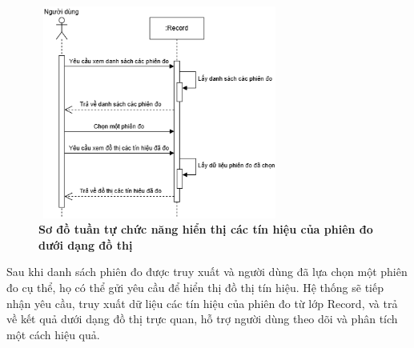 \begin{figure}[H]
	\centering
	\includegraphics[width=8cm,height=7cm]{Images/sequence/record/chart.drawio.png}
	\caption[Sơ đồ tuần tự chức năng hiển thị các tín hiệu của phiên đo dưới dạng đồ thị]{\bfseries \fontsize{12pt}{0pt}
		\selectfont Sơ đồ tuần tự chức năng hiển thị các tín hiệu của phiên đo dưới dạng đồ thị}
	\label{sequence_chart} %
\end{figure}
Sau khi danh sách phiên đo được truy xuất và người dùng đã lựa chọn một phiên đo cụ thể, họ có thể gửi yêu cầu để hiển thị đồ thị tín hiệu.
Hệ thống sẽ tiếp nhận yêu cầu, truy xuất dữ liệu các tín hiệu của phiên đo từ lớp Record, và trả về kết quả dưới dạng đồ thị trực quan, hỗ trợ người dùng theo dõi và phân tích một cách hiệu quả.

